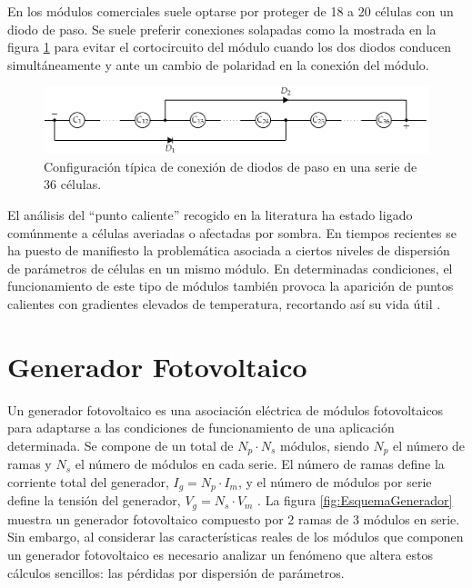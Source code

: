 En los módulos comerciales suele optarse por proteger de 18 a 20 células
con un diodo de paso. Se suele preferir conexiones solapadas como
la mostrada en la figura \ref{fig:ConexionTipicaDiodosPaso} para
evitar el cortocircuito del módulo cuando los dos diodos conducen
simultáneamente y ante un cambio de polaridad en la conexión del módulo.


\begin{figure}
\begin{centering}
\includegraphics{../figs/AsociacionSerieCelulas_DiodosPasoAlternos}
\end{centering}

\caption{Configuración típica de conexión de diodos de paso en una serie de
36 células.\label{fig:ConexionTipicaDiodosPaso}}

\end{figure}

El análisis del {}``punto caliente'' recogido en la literatura ha
estado ligado comúnmente a células averiadas o afectadas por sombra.
En tiempos recientes se ha puesto de manifiesto la problemática asociada
a ciertos niveles de dispersión de parámetros de células en un mismo
módulo. En determinadas condiciones, el funcionamiento de este tipo
de módulos también provoca la aparición de puntos calientes con gradientes
elevados de temperatura, recortando así su vida útil \cite{Lorenzo.Martinez.ea2009}.


\section{Generador Fotovoltaico}

Un generador fotovoltaico es una asociación eléctrica de módulos fotovoltaicos
para adaptarse a las condiciones de funcionamiento de una aplicación
determinada. Se compone de un total de $N_{p}\cdot N_{s}$ módulos,
siendo $N_{p}$ el número de ramas y $N_{s}$ el número de módulos
en cada serie. El número de ramas define la corriente total del generador,
$I_{g}=N_{p}\cdot I_{m}$, y el número de módulos por serie define
la tensión del generador, $V_{g}=N_{s}\cdot V_{m}$
. La figura \ref{fig:EsquemaGenerador} muestra un generador fotovoltaico
compuesto por 2 ramas de 3 módulos en serie. Sin embargo, al considerar
las características reales de los módulos que componen un generador
fotovoltaico es necesario analizar un fenómeno que altera estos cálculos
sencillos: las pérdidas por dispersión de parámetros.


